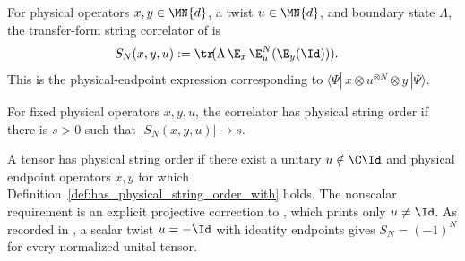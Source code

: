 \begin{definition}\label{def:physical_string_order_param}
    \leanok
    For physical operators $x,y \in \MN{d}$, a twist $u \in \MN{d}$, and
    boundary state $\Lambda$, the transfer-form string correlator of
    \cite[display~SOPMP, lines~176--181]{PerezGarcia2008StringOrder} is
    \begin{align}
        S_N(x,y,u)
         & := \tr\!(\Lambda\,\E_x\,\E_u^N(\E_y(\Id))).
        \label{eq:symmetry_physical_string}
    \end{align}
    This is the physical-endpoint expression corresponding to
    $\langle \Psi|\,x \otimes u^{\otimes N} \otimes y\,|\Psi\rangle$.
\end{definition}



\begin{definition}
    \label{def:has_physical_string_order_with}
    \leanok
    For fixed physical operators $x,y,u$, the correlator has physical string
    order if there is $s>0$ such that $|S_N(x,y,u)|\to s$.
\end{definition}

\begin{definition}
    \label{def:has_physical_string_order}
    \leanok
    A tensor has physical string order if there exist a unitary
    $u\notin\C\Id$ and physical endpoint operators $x,y$ for which
    Definition~\ref{def:has_physical_string_order_with} holds.
    The nonscalar requirement is an explicit projective correction to
    \cite[display~SOP, lines~114--121]{PerezGarcia2008StringOrder}, which
    prints only $u\ne\Id$. As recorded in
    \cite{gap:pgwsvc08_string_order_virtual_boundary}, a scalar twist
    $u=-\Id$ with identity endpoints gives $S_N=(-1)^N$ for every normalized
    unital tensor.
\end{definition}

